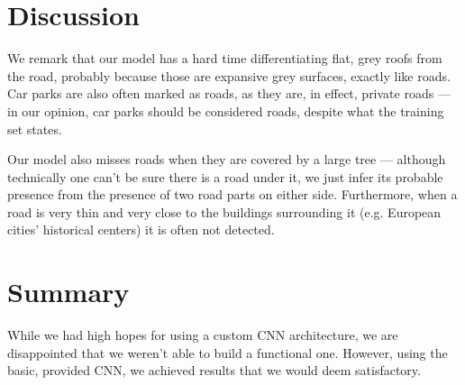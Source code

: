 \documentclass[11pt,conference,compsocconf]{IEEEtran}
\begin{document}
\section{Discussion}
We remark that our model has a hard time differentiating flat, grey roofs from the road, probably because those are expansive grey surfaces, exactly like roads. Car parks are also often marked as roads, as they are, in effect, private roads --- in our opinion, car parks should be considered roads, despite what the training set states.

Our model also misses roads when they are covered by a large tree --- although technically one can't be sure there is a road under it, we just infer its probable presence from the presence of two road parts on either side. Furthermore, when a road is very thin and very close to the buildings surrounding it (e.g. European cities' historical centers) it is often not detected.

\section{Summary}
While we had high hopes for using a custom CNN architecture, we are disappointed that we weren't able to build a functional one. However, using the basic, provided CNN, we achieved results that we would deem satisfactory.
\end{document}
